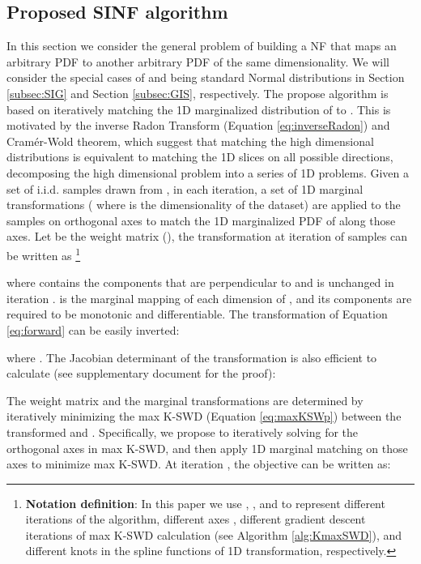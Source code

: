 \documentclass{article}
\begin{document}
\subsection{Proposed SINF algorithm}

\label{subsec:algorithm}

In this section we consider the general problem of building a NF that maps an arbitrary PDF  to another arbitrary PDF  of the same dimensionality. We will consider the special cases of  and  being standard Normal distributions in Section \ref{subsec:SIG} and Section \ref{subsec:GIS}, respectively. The propose algorithm is based on iteratively matching the 1D marginalized distribution of  to . This is motivated by the inverse Radon Transform (Equation \ref{eq:inverseRadon}) and Cram{\'e}r-Wold theorem, which suggest that matching the high dimensional distributions is equivalent to matching the 1D slices on all possible directions, decomposing the high dimensional problem into a series of 1D problems. Given a set of i.i.d. samples  drawn from , in each iteration, a set of 1D marginal transformations  ( where  is the dimensionality of the dataset) are applied to the samples on orthogonal axes  to match the 1D marginalized PDF of  along those axes. Let  be the weight matrix (), the transformation at iteration  of samples  can be written as
\footnote{{\bf Notation definition}: In this paper we use , ,  and  to represent different iterations of the algorithm, different axes , different gradient descent iterations of max K-SWD calculation (see Algorithm \ref{alg:KmaxSWD}), and different knots in the spline functions of 1D transformation, respectively.}

where  contains the components that are perpendicular to  and is unchanged in iteration .  is the marginal mapping of each dimension of , and its components are required to be monotonic and differentiable. The transformation of Equation \ref{eq:forward} can be easily inverted:

where . The Jacobian determinant of the transformation is also efficient to calculate (see supplementary document for the proof):


The weight matrix  and the marginal transformations  are determined by iteratively minimizing the max K-SWD (Equation \ref{eq:maxKSWp}) between the transformed  and . Specifically, we propose to iteratively solving for the orthogonal axes  in max K-SWD, and then apply 1D marginal matching on those axes to minimize max K-SWD. At iteration , the objective can be written as:
\end{document}
